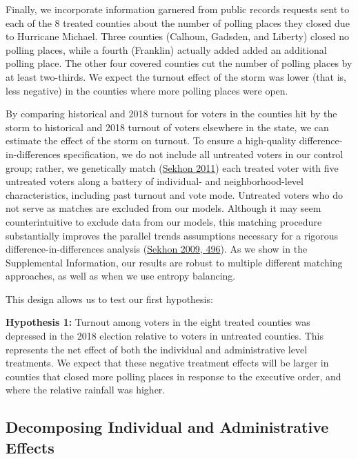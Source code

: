 \documentclass[
  12pt,
]{article}
\begin{document}
Finally, we incorporate information garnered from public records requests sent to each of the 8 treated counties about the number of polling places they closed due to Hurricane Michael. Three counties (Calhoun, Gadsden, and Liberty) closed no polling places, while a fourth (Franklin) actually added added an additional polling place. The other four covered counties cut the number of polling places by at least two-thirds. We expect the turnout effect of the storm was lower (that is, less negative) in the counties where more polling places were open.

By comparing historical and 2018 turnout for voters in the counties hit by the storm to historical and 2018 turnout of voters elsewhere in the state, we can estimate the effect of the storm on turnout. To ensure a high-quality difference-in-differences specification, we do not include all untreated voters in our control group; rather, we genetically match (\protect\hyperlink{ref-Sekhon2011}{Sekhon 2011}) each treated voter with five untreated voters along a battery of individual- and neighborhood-level characteristics, including past turnout and vote mode. Untreated voters who do not serve as matches are excluded from our models. Although it may seem counterintuitive to exclude data from our models, this matching procedure substantially improves the parallel trends assumptions necessary for a rigorous difference-in-differences analysis (\protect\hyperlink{ref-Sekhon2009}{Sekhon 2009, 496}). As we show in the Supplemental Information, our results are robust to multiple different matching approaches, as well as when we use entropy balancing.

This design allows us to test our first hypothesis:

\textbf{Hypothesis 1:} Turnout among voters in the eight treated counties was depressed in the 2018 election relative to voters in untreated counties. This represents the net effect of both the individual and administrative level treatments. We expect that these negative treatment effects will be larger in counties that closed more polling places in response to the executive order, and where the relative rainfall was higher.

\hypertarget{decomposing-individual-and-administrative-effects}{%
\subsection*{Decomposing Individual and Administrative Effects}\label{decomposing-individual-and-administrative-effects}}
\end{document}
